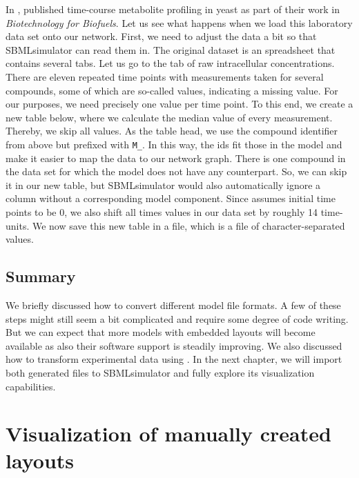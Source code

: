 In \citeyear{Bergdahl2012}, \citeauthor{Bergdahl2012} published time-course metabolite profiling in yeast as part of their work in \emph{Biotechnology for Biofuels}.
Let us see what happens when we load this laboratory data set onto our network.
First, we need to adjust the data a bit so that SBMLsimulator can read them in.
The original dataset is an \Excel spreadsheet that contains several tabs.
Let us go to the tab of raw intracellular concentrations.
There are eleven repeated time points with measurements taken for several compounds, some of which are so-called \NaN values, indicating a missing value.
For our purposes, we need precisely one value per time point.
To this end, we create a new table below, where we calculate the median value of every measurement.
Thereby, we skip all \NaN values.
As the table head, we use the compound identifier from above but prefixed with \texttt{M\_}.
In this way, the ids fit those in the \SBML model and make it easier to map the data to our network graph.
There is one compound in the data set for which the model does not have any counterpart.
So, we can skip it in our new table, but SBMLsimulator would also automatically ignore a column without a corresponding model component.
Since \SBML assumes initial time points to be 0, we also shift all times values in our data set by roughly 14 time-units.
We now save this new table in a \CSV file, which is a file of character-separated values.

\section{Summary}

We briefly discussed how to convert different model file formats.
A few of these steps might still seem a bit complicated and require some degree of code writing.
But we can expect that more models with embedded layouts will become available as also their software support is steadily improving.
We also discussed how to transform experimental data using \Excel.
In the next chapter, we will import both generated files to SBMLsimulator and fully explore its visualization capabilities.


\chapter{Visualization of manually created layouts}
\label{chap:VisLayout}

